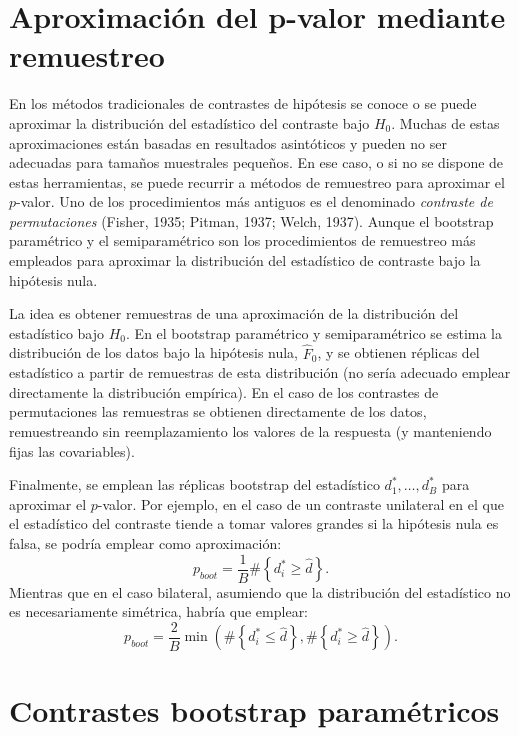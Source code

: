 \documentclass[]{book}
\theoremstyle{break}
\theoremstyle{definition}
\theoremstyle{definition}
\theoremstyle{definition}
\theoremstyle{remark}
\begin{document}
\section{Aproximación del p-valor mediante
remuestreo}\label{aproximaciuxf3n-del-p-valor-mediante-remuestreo}

En los métodos tradicionales de contrastes de hipótesis se conoce o se
puede aproximar la distribución del estadístico del contraste bajo
\(H_0\). Muchas de estas aproximaciones están basadas en resultados
asintóticos y pueden no ser adecuadas para tamaños muestrales pequeños.
En ese caso, o si no se dispone de estas herramientas, se puede recurrir
a métodos de remuestreo para aproximar el \(p\)-valor. Uno de los
procedimientos más antiguos es el denominado \emph{contraste de
permutaciones} (Fisher, 1935; Pitman, 1937; Welch, 1937). Aunque el
bootstrap paramétrico y el semiparamétrico son los procedimientos de
remuestreo más empleados para aproximar la distribución del estadístico
de contraste bajo la hipótesis nula.

La idea es obtener remuestras de una aproximación de la distribución del
estadístico bajo \(H_0\). En el bootstrap paramétrico y semiparamétrico
se estima la distribución de los datos bajo la hipótesis nula,
\(\hat{F}_0\), y se obtienen réplicas del estadístico a partir de
remuestras de esta distribución (no sería adecuado emplear directamente
la distribución empírica). En el caso de los contrastes de permutaciones
las remuestras se obtienen directamente de los datos, remuestreando sin
reemplazamiento los valores de la respuesta (y manteniendo fijas las
covariables).

Finalmente, se emplean las réplicas bootstrap del estadístico
\(d_1^{\ast},\ldots, d_B^{\ast}\) para aproximar el \(p\)-valor. Por
ejemplo, en el caso de un contraste unilateral en el que el estadístico
del contraste tiende a tomar valores grandes si la hipótesis nula es
falsa, se podría emplear como aproximación:
\[p_{boot} = \frac{1}{B}\#\left\{ d_i^{\ast} \geq \hat{d} \right\}.\]
Mientras que en el caso bilateral, asumiendo que la distribución del
estadístico no es necesariamente simétrica, habría que emplear:
\[p_{boot} = \frac{2}{B} \min \left(\#\left\{ d_i^{\ast} \leq \hat{d} \right\},
\#\left\{ d_i^{\ast} \geq \hat{d} \right\}\right).\]

\section{Contrastes bootstrap
paramétricos}\label{contrastes-parametricos}
\end{document}
